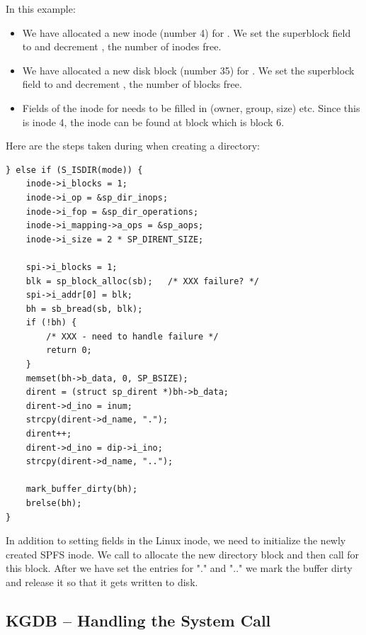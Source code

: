 \noindent
In this example:

\begin{itemize}
	\item We have allocated a new inode (number 4) for . We set the superblock 
		field to  and decrement , the number of 
		inodes free.
	\item We have allocated a new disk block (number 35) for . We set the superblock 
		field to  and decrement , the number of 
		blocks free.
	\item Fields of the inode for  needs to be filled in (owner, group, size) etc. Since this is inode
		4, the inode can be found at block  which is block 6.
\end{itemize}

\noindent
Here are the steps taken during  when creating a directory:

\begin{lstlisting}
} else if (S_ISDIR(mode)) {
	inode->i_blocks = 1;
	inode->i_op = &sp_dir_inops;
	inode->i_fop = &sp_dir_operations;
	inode->i_mapping->a_ops = &sp_aops;
	inode->i_size = 2 * SP_DIRENT_SIZE;

	spi->i_blocks = 1;
	blk = sp_block_alloc(sb);   /* XXX failure? */
	spi->i_addr[0] = blk;
	bh = sb_bread(sb, blk);
	if (!bh) {
		/* XXX - need to handle failure */
		return 0;
	}
	memset(bh->b_data, 0, SP_BSIZE);
	dirent = (struct sp_dirent *)bh->b_data;
	dirent->d_ino = inum;
	strcpy(dirent->d_name, ".");
	dirent++;
	dirent->d_ino = dip->i_ino;
	strcpy(dirent->d_name, "..");

	mark_buffer_dirty(bh);
	brelse(bh);
}
\end{lstlisting}

\noindent
In addition to setting fields in the Linux inode, we need to initialize the newly created SPFS inode. We call  to allocate the new directory block and then call  for this block. After we have set the entries for "." and ".." we mark the buffer dirty and release it so that it gets written to disk.


\subsection{KGDB -- Handling the  System Call}

